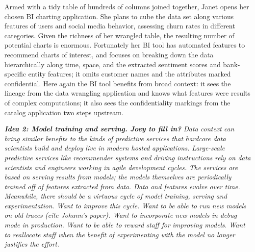 \documentclass{sig-alternate}
\begin{document}
Armed with a tidy table of hundreds of columns joined together, Janet opens her chosen BI charting application. She plans to cube the data set along various features of users and social media behavior, assessing churn rates in different categories. Given the richness of her wrangled table, the resulting number of potential charts is enormous. Fortunately her BI tool has automated features to recommend charts of interest, and focuses on breaking down the data hierarchically along time, space, and the extracted sentiment scores and bank-specific entity features; it omits customer names and the attributes marked confidential.  Here again the BI tool benefits from broad context: it sees the lineage from the data wrangling application and knows what features were results of complex computations; it also sees the confidentiality markings from the catalog application two steps upstream.




\emph{\textbf{Idea 2: Model training and serving.  Joey to fill in?} 
Data context can bring similar benefits to the kinds of predictive services that hardcore data scientists build and deploy live in modern hosted applications.  Large-scale predictive services like recommender systems and driving instructions rely on data scientists and engineers working in agile development cycles.  The services are based on serving results from models; the models themselves are periodically trained off of features extracted from data. Data and features evolve over time. Meanwhile, there should be a virtuous cycle of model training, serving and experimentation.  Want to improve this cycle. Want to be able to run new models on old traces (cite Johann's paper). Want to incorporate new models in debug mode in production. Want to be able to reward staff for improving models. Want to reallocate staff when the benefit of experimenting with the model no longer justifies the effort.}
\end{document}
